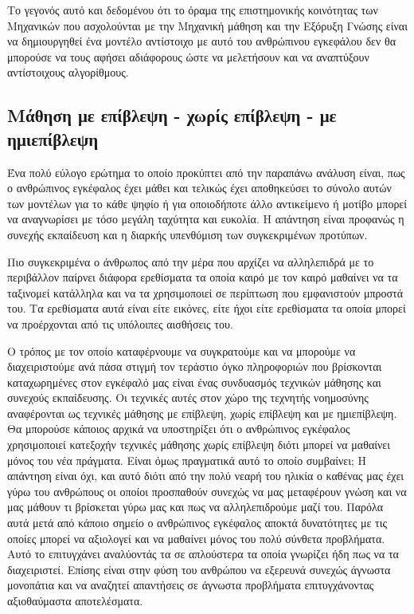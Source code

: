 \par Το γεγονός αυτό και δεδομένου ότι το όραμα της επιστημονικής κοινότητας των Μηχανικών που ασχολούνται με την Μηχανική μάθηση και την Εξόρυξη Γνώσης είναι να δημιουργηθεί ένα μοντέλο αντίστοιχο με αυτό του ανθρώπινου εγκεφάλου δεν θα μπορούσε να τους αφήσει αδιάφορους ώστε να μελετήσουν και να αναπτύξουν αντίστοιχους αλγορίθμους.

\subsection{Μάθηση με επίβλεψη - χωρίς επίβλεψη - με ημιεπίβλεψη}
\par
Ένα πολύ εύλογο ερώτημα το οποίο προκύπτει από την παραπάνω ανάλυση είναι, πως ο ανθρώπινος εγκέφαλος έχει μάθει και τελικώς έχει αποθηκεύσει το σύνολο αυτών των μοντέλων για το κάθε ψηφίο ή για οποιοδήποτε άλλο αντικείμενο ή μοτίβο μπορεί να αναγνωρίσει με τόσο μεγάλη ταχύτητα και ευκολία. Η απάντηση είναι προφανώς η συνεχής εκπαίδευση και η διαρκής υπενθύμιση των συγκεκριμένων προτύπων.
\par
Πιο συγκεκριμένα ο άνθρωπος από την μέρα που αρχίζει να αλληλεπιδρά με το περιβάλλον παίρνει διάφορα ερεθίσματα τα οποία καιρό με τον καιρό μαθαίνει να τα ταξινομεί κατάλληλα και να τα χρησιμοποιεί σε περίπτωση που εμφανιστούν μπροστά του. Τα ερεθίσματα αυτά είναι είτε εικόνες, είτε ήχοι είτε ερεθίσματα τα οποία μπορεί να προέρχονται από τις υπόλοιπες αισθήσεις του.
\par
Ο τρόπος με τον οποίο καταφέρνουμε να συγκρατούμε και να μπορούμε να διαχειριστούμε ανά πάσα στιγμή τον τεράστιο όγκο πληροφοριών που βρίσκονται καταχωρημένες στον εγκέφαλό μας είναι ένας συνδυασμός τεχνικών μάθησης και συνεχούς εκπαίδευσης. Οι τεχνικές αυτές στον χώρο της τεχνητής νοημοσύνης αναφέρονται ως τεχνικές μάθησης με επίβλεψη, χωρίς επίβλεψη και με ημιεπίβλεψη. Θα μπορούσε κάποιος αρχικά να υποστηρίξει ότι ο ανθρώπινος εγκέφαλος χρησιμοποιεί κατεξοχήν τεχνικές μάθησης χωρίς επίβλεψη διότι μπορεί να μαθαίνει μόνος του νέα πράγματα. Είναι όμως πραγματικά αυτό το οποίο συμβαίνει; Η απάντηση είναι όχι, και αυτό διότι από την πολύ νεαρή του ηλικία ο καθένας μας έχει γύρω του ανθρώπους οι οποίοι προσπαθούν συνεχώς να μας μεταφέρουν γνώση και να μας μάθουν τι βρίσκεται γύρω μας και πως να αλληλεπιδρούμε μαζί του. Παρόλα αυτά μετά από κάποιο σημείο ο ανθρώπινος εγκέφαλος αποκτά δυνατότητες με τις οποίες μπορεί να αξιολογεί και να μαθαίνει μόνος του πολύ σύνθετα προβλήματα. Αυτό το επιτυγχάνει αναλύοντάς τα σε απλούστερα τα οποία γνωρίζει ήδη πως να τα διαχειριστεί. Επίσης είναι στην φύση του ανθρώπου να εξερευνά συνεχώς άγνωστα μονοπάτια και να αναζητεί απαντήσεις σε άγνωστα προβλήματα επιτυγχάνοντας αξιοθαύμαστα αποτελέσματα.
